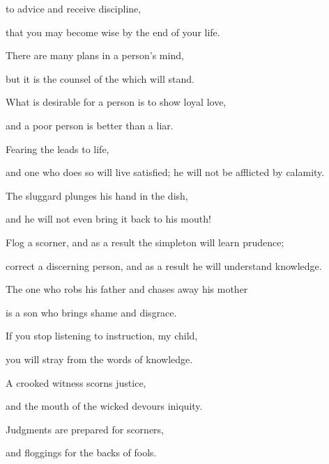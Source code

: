 {to advice
and receive
discipline,
\par }{\Q that you may
become wise
by the end of your life.
\par }{\Q {}There are many
plans
in a person’s
mind,
\par }{\Q but
it is
the counsel
of the
{}
which will stand.
\par }{\Q {}What is desirable
for a person
is to show loyal love,
\par }{\Q and a poor
person
is better
than a liar.
\par }{\Q {}Fearing
the {}
leads to life,
\par }{\Q and one who does so will live
satisfied;
he will not
be afflicted by
calamity.
\par }{\Q {}The sluggard
plunges
his hand
in the dish,
\par }{\Q and he will not
even
bring it back
to
his mouth!
\par }{\Q {}Flog
a scorner,
and as a result the simpleton
will learn prudence;
\par }{\Q correct
a discerning person,
and as a result he will understand
knowledge.
\par }{\Q {}The one who robs
his father
and chases away
his mother
\par }{\Q is a son
who brings shame
and disgrace.
\par }{\Q {}If you stop
listening
to instruction,
my child,
\par }{\Q you will stray
from the words
of knowledge.
\par }{\Q {}A crooked
witness
scorns
justice,
\par }{\Q and the mouth
of the wicked
devours
iniquity.
\par }{\Q {}Judgments
are prepared
for scorners,
\par }{\Q and floggings
for the backs
of fools.

}
